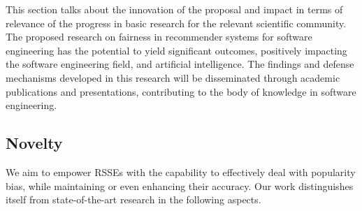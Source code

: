 










This section talks about the innovation of the proposal and impact in terms of relevance of the progress in basic research for the relevant scientific community. 
The proposed research on fairness %
in recommender systems for software engineering has the potential to yield significant outcomes, %
positively impacting the software engineering field, and artificial intelligence.%
The findings and defense mechanisms developed in this research will be disseminated through academic publications and presentations, contributing to the body of knowledge in software engineering. %




\subsection{Novelty}



We aim to empower RSSEs %
with the capability to effectively deal with popularity bias, while maintaining or even enhancing their accuracy. Our work distinguishes itself from state-of-the-art research in the following aspects.

